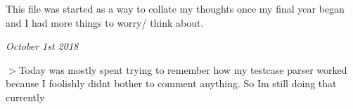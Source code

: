 This file was started as a way to collate my thoughts once my final year began and I had more things to worry/ think about.

{\itshape October 1st 2018}

$>$Today was mostly spent trying to remember how my testcase parser worked because I foolishly didn\textquotesingle{}t bother to comment anything. So I\textquotesingle{}m still doing that currently 